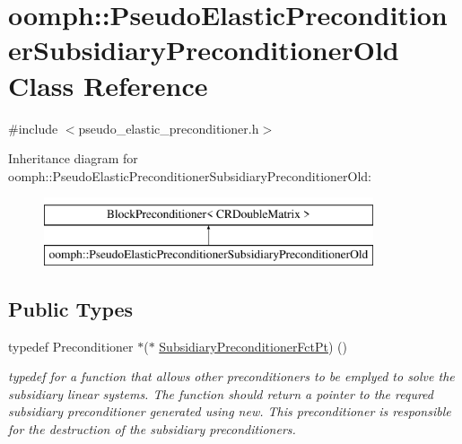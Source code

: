 \hypertarget{classoomph_1_1PseudoElasticPreconditionerSubsidiaryPreconditionerOld}{}\section{oomph\+:\+:Pseudo\+Elastic\+Preconditioner\+Subsidiary\+Preconditioner\+Old Class Reference}
\label{classoomph_1_1PseudoElasticPreconditionerSubsidiaryPreconditionerOld}


{\ttfamily \#include $<$pseudo\+\_\+elastic\+\_\+preconditioner.\+h$>$}

Inheritance diagram for oomph\+:\+:Pseudo\+Elastic\+Preconditioner\+Subsidiary\+Preconditioner\+Old\+:\begin{figure}[H]
\begin{center}
\leavevmode
\includegraphics[height=2.000000cm]{classoomph_1_1PseudoElasticPreconditionerSubsidiaryPreconditionerOld}
\end{center}
\end{figure}
\subsection*{Public Types}
\begin{DoxyCompactItemize}
\item 
typedef Preconditioner $\ast$($\ast$ \hyperlink{classoomph_1_1PseudoElasticPreconditionerSubsidiaryPreconditionerOld_a2ee5b7ddad26a4eb6662e2b701ab0a52}{Subsidiary\+Preconditioner\+Fct\+Pt}) ()
\begin{DoxyCompactList}\small\item\em typedef for a function that allows other preconditioners to be emplyed to solve the subsidiary linear systems. The function should return a pointer to the requred subsidiary preconditioner generated using new. This preconditioner is responsible for the destruction of the subsidiary preconditioners. \end{DoxyCompactList}\end{DoxyCompactItemize}
